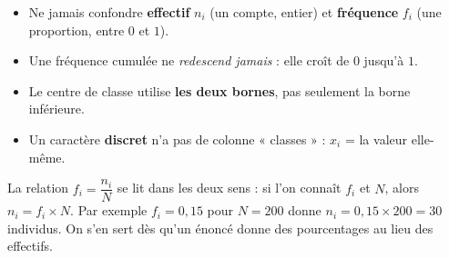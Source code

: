 \documentclass[11pt,a4paper]{article}
\begin{document}
\begin{attention}
\begin{itemize}
  \item Ne jamais confondre \textbf{effectif} $n_i$ (un compte, entier) et \textbf{fréquence} $f_i$
        (une proportion, entre $0$ et $1$).
  \item Une fréquence cumulée ne \emph{redescend jamais} : elle croît de $0$ jusqu'à $1$.
  \item Le centre de classe utilise \textbf{les deux bornes}, pas seulement la borne inférieure.
  \item Un caractère \textbf{discret} n'a pas de colonne « classes » : $x_i$ = la valeur elle-même.
\end{itemize}
\end{attention}

\begin{remarque}
La relation $f_i=\dfrac{n_i}{N}$ se lit dans les deux sens : si l'on connaît $f_i$ et $N$, alors
$n_i=f_i\times N$. Par exemple $f_i=0{,}15$ pour $N=200$ donne $n_i=0{,}15\times 200=30$ individus.
On s'en sert dès qu'un énoncé donne des pourcentages au lieu des effectifs.
\end{remarque}
\end{document}
